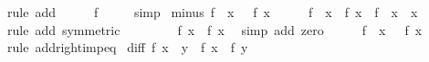 \begin{isabellebody}
\ {\isacharparenleft}{\kern0pt}rule\ add{\isacharparenright}{\kern0pt}\isanewline
\ \ \isamarkupfalse%
\ \isamarkupfalse%
\ {\isachardoublequoteopen}f\ {}\ {\isacharequal}{\kern0pt}\ {}{\isachardoublequoteclose}\ \isamarkupfalse%
\ simp\isanewline
{}\isamarkupfalse%
%
\endisatagproof
{\isafoldproof}%
%
\isadelimproof
\isanewline
%
\endisadelimproof
\isanewline
{}\isamarkupfalse%
\ minus{\isacharcolon}{\kern0pt}\ {\isachardoublequoteopen}f\ {\isacharparenleft}{\kern0pt}{\isacharminus}{\kern0pt}\ x{\isacharparenright}{\kern0pt}\ {\isacharequal}{\kern0pt}\ {\isacharminus}{\kern0pt}\ f\ x{\isachardoublequoteclose}\isanewline
%
\isadelimproof
%
\endisadelimproof
%
\isatagproof
{}\isamarkupfalse%
\ {\isacharminus}{\kern0pt}\isanewline
\ \ \isamarkupfalse%
\ {\isachardoublequoteopen}f\ {\isacharparenleft}{\kern0pt}{\isacharminus}{\kern0pt}\ x{\isacharparenright}{\kern0pt}\ {\isacharplus}{\kern0pt}\ f\ x\ {\isacharequal}{\kern0pt}\ f\ {\isacharparenleft}{\kern0pt}{\isacharminus}{\kern0pt}\ x\ {\isacharplus}{\kern0pt}\ x{\isacharparenright}{\kern0pt}{\isachardoublequoteclose}\ \isamarkupfalse%
\ {\isacharparenleft}{\kern0pt}rule\ add\ {\isacharbrackleft}{\kern0pt}symmetric{\isacharbrackright}{\kern0pt}{\isacharparenright}{\kern0pt}\isanewline
\ \ \isamarkupfalse%
\ \isamarkupfalse%
\ {\isachardoublequoteopen}{\isasymdots}\ {\isacharequal}{\kern0pt}\ {\isacharminus}{\kern0pt}\ f\ x\ {\isacharplus}{\kern0pt}\ f\ x{\isachardoublequoteclose}\ \isamarkupfalse%
\ {\isacharparenleft}{\kern0pt}simp\ add{\isacharcolon}{\kern0pt}\ zero{\isacharparenright}{\kern0pt}\isanewline
\ \ \isamarkupfalse%
\ \isamarkupfalse%
\ {\isachardoublequoteopen}f\ {\isacharparenleft}{\kern0pt}{\isacharminus}{\kern0pt}\ x{\isacharparenright}{\kern0pt}\ {\isacharequal}{\kern0pt}\ {\isacharminus}{\kern0pt}\ f\ x{\isachardoublequoteclose}\ \isamarkupfalse%
\ {\isacharparenleft}{\kern0pt}rule\ add{\isacharunderscore}{\kern0pt}right{\isacharunderscore}{\kern0pt}imp{\isacharunderscore}{\kern0pt}eq{\isacharparenright}{\kern0pt}\isanewline
{}\isamarkupfalse%
%
\endisatagproof
{\isafoldproof}%
%
\isadelimproof
\isanewline
%
\endisadelimproof
\isanewline
{}\isamarkupfalse%
\ diff{\isacharcolon}{\kern0pt}\ {\isachardoublequoteopen}f\ {\isacharparenleft}{\kern0pt}x\ {\isacharminus}{\kern0pt}\ y{\isacharparenright}{\kern0pt}\ {\isacharequal}{\kern0pt}\ f\ x\ {\isacharminus}{\kern0pt}\ f\ y{\isachardoublequoteclose}\isanewline

\end{isabellebody}
